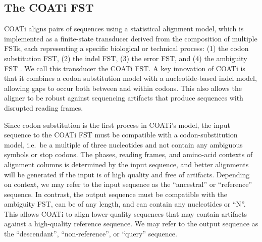 \documentclass[12pt,letterpaper]{article}
\begin{document}
\subsection*{The COATi FST}

COATi aligns pairs of sequences using a statistical alignment model, which is implemented as a finite-state transducer derived from the composition of multiple FSTs, each representing a specific biological or technical process: (1) the codon substitution FST, (2) the indel FST, (3) the error FST, and (4) the ambiguity FST \citep[Figs.~\ref{fig:base-calling}--\ref{fig:coati-fst}; c.f.][]{holmes2001evolutionary}. We call this transducer the COATi FST. A key innovation of COATi is that it combines a codon substitution model with a nucleotide-based indel model, allowing gaps to occur both between and within codons. This also allows the aligner to be robust against sequencing artifacts that produce sequences with disrupted reading frames.

Since codon substitution is the first process in COATi's model, the input sequence to the COATi FST must be compatible with a codon-substitution model, i.e.\ be a multiple of three nucleotides and not contain any ambiguous symbols or stop codons. The phases, reading frames, and amino-acid contexts of alignment columns is determined by the input sequence, and better alignments will be generated if the input is of high quality and free of artifacts. Depending on context, we may refer to the input sequence as the ``ancestral'' or ``reference'' sequence. In contrast, the output sequence must be compatible with the ambiguity FST, can be of any length, and can contain any nucleotides or ``N''. This allows COATi to align lower-quality sequences that may contain artifacts against a high-quality reference sequence. We may refer to the output sequence as the ``descendant'', ``non-reference'', or ``query'' sequence.
\end{document}
